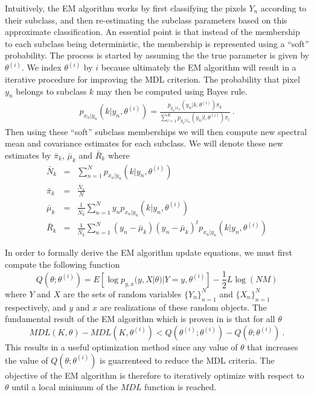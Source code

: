 \documentclass[12pt]{article}
\begin{document}
Intuitively, the EM algorithm works 
by first classifying the pixels $Y_n$ according
to their subclass,
and then re-estimating the subclass parameters based on this
approximate classification.
An essential point is that instead of the membership to each subclass
being deterministic,
the membership is represented using a ``soft'' probability.
The process is started by assuming the the true parameter
is given by $\theta^{(i)}$.
We index $\theta^{(i)}$ by $i$ because ultimately
the EM algorithm will result in a iterative procedure
for improving the MDL criterion.
The probability that pixel $y_n$ belongs to subclass $k$ may
then be computed using Bayes rule.
\begin{eqnarray*}
p_{x_n|y_n} (k|y_n,\theta^{(i)}) = 
\frac{p_{y_n|x_n} (y_n|k,\theta^{(i)}) \pi_k}
     {\sum_{l=1}^K p_{y_n|x_n} (y_n|l,\theta^{(i)}) \pi_l} \ .
\end{eqnarray*}
Then using these ``soft'' subclass memberships we will
then compute
new spectral mean and covariance estimates for each subclass.
We will denote these new estimates 
by $\bar{\pi}_k$, $\bar{\mu}_k$ and $\bar{R}_k$
where
\begin{eqnarray}
\label{eq:bar_values1}
\bar{N}_k &=& \sum_{n=1}^N p_{x_n|y_n} (k|y_n,\theta^{(i)}) \\
\label{eq:bar_values2}
\bar{\pi}_k &=& \frac{ \bar{N}_k }{N}\\
\label{eq:bar_values3}
\bar{\mu}_k &=& \frac{1}{\bar{N}_k}\sum_{n=1}^N y_n 
                p_{x_n|y_n} (k|y_n,\theta^{(i)}) \\
\label{eq:bar_values4}
\bar{R}_k &=& \frac{1}{\bar{N}_k}\sum_{n=1}^N 
(y_n-\bar{\mu}_k)(y_n-\bar{\mu}_k)^t p_{x_n|y_n} (k|y_n,\theta^{(i)})
\end{eqnarray}

In order to formally derive the EM algorithm update equations,
we must first compute the following function
$$
Q(\theta;\theta^{(i)}) 
= E\left[  \log p_{y,x}(y,X|\theta) | Y=y, \theta^{(i)} \right]
- \frac{1}{2} L \log (NM)
$$
where $Y$ and $X$ are the sets of random variables 
$\{Y_n\}_{n=1}^N$ and $\{X_n\}_{n=1}^N$ respectively,
and $y$ and $x$ are realizations of these random objects.
The fundamental result of the EM algorithm
which is proven in \cite{BaPeSoWe70} is that for all $\theta$
$$
MDL(K,\theta) - MDL(K,\theta^{(i)}) 
<
Q( \theta^{(i)}; \theta^{(i)}) - Q(\theta; \theta^{(i)}) \ .
$$
This results in a useful optimization method since 
any value of $\theta$ that increases the value of $Q(\theta; \theta^{(i)})$
is guarrenteed to reduce the MDL criteria.
The objective of the EM algorithm is therefore to iteratively
optimize with respect to $\theta$ until a local minimum
of the $MDL$ function is reached.
\end{document}
